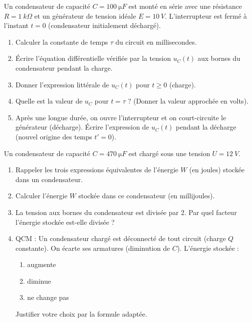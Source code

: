\documentclass[11pt]{article}
\begin{document}
\begin{exercice}
Un condensateur de capacité $C = \SI{100}{\micro F}$ est monté en série avec une résistance $R = \SI{1}{k\Omega}$ et un générateur de tension idéale $E = \SI{10}{V}$. L'interrupteur est fermé à l'instant $t=0$ (condensateur initialement déchargé).
\begin{enumerate}
    \item Calculer la constante de temps $\tau$ du circuit en millisecondes.
    \item Écrire l'équation différentielle vérifiée par la tension $u_C(t)$ aux bornes du condensateur pendant la charge.
    \item Donner l'expression littérale de $u_C(t)$ pour $t \ge 0$ (charge).
    \item Quelle est la valeur de $u_C$ pour $t = \tau$ ? (Donner la valeur approchée en volts).
    \item Après une longue durée, on ouvre l'interrupteur et on court-circuite le générateur (décharge). Écrire l'expression de $u_C(t)$ pendant la décharge (nouvel origine des temps $t'=0$).
\end{enumerate}
\end{exercice}

\begin{exercice}
Un condensateur de capacité $C = \SI{470}{\micro F}$ est chargé sous une tension $U = \SI{12}{V}$.
\begin{enumerate}
    \item Rappeler les trois expressions équivalentes de l'énergie $W$ (en joules) stockée dans un condensateur.
    \item Calculer l'énergie $W$ stockée dans ce condensateur (en millijoules).
    \item La tension aux bornes du condensateur est divisée par 2. Par quel facteur l'énergie stockée est-elle divisée ?
    \item QCM : Un condensateur chargé est déconnecté de tout circuit (charge $Q$ constante). On écarte ses armatures (diminution de $C$). L'énergie stockée :
    \begin{enumerate}
        \item augmente
        \item diminue
        \item ne change pas
    \end{enumerate}
    Justifier votre choix par la formule adaptée.
\end{enumerate}
\end{exercice}
\end{document}
